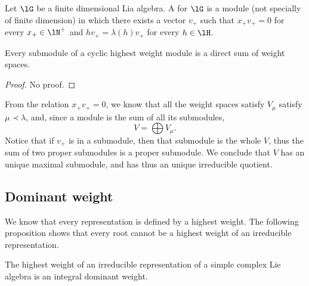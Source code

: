 \begin{definition}
	Let $\lG$ be a finite dimensional Lia algebra. A  for $\lG$ is a module (not specially of finite dimension) in which there exists a vector $v_+$ such that $x_+v_+=0$ for every $x_+\in\lN^+$ and $hv_+=\lambda(h)v_+$ for every $h\in\lH$.
\end{definition}

\begin{proposition}
	Every submodule of a cyclic highest weight module is a direct sum of weight spaces.
\end{proposition}
\begin{proof}
	No proof.
\end{proof}

From the relation $x_+v_+=0$, we know that all the weight spaces satisfy $V_{\mu}$ satisfy $\mu\prec\lambda$, and, since a module is the sum of all its submodules,
\begin{equation}        \label{EqVsumValpha}
	V=\bigoplus V_{\mu}.
\end{equation}
Notice that if $v_+$ is in a submodule, then that submodule is the whole $V$, thus the sum of two proper submodules is a proper submodule. We conclude that $V$ has an unique maximal submodule, and has thus an unique irreducible quotient.

\subsection{Dominant weight}
\label{SubSecDomiunSei}

We know that every representation is defined by a highest weight. The following proposition shows that every root cannot be a highest weight of an irreducible representation.

\begin{proposition}
	The highest weight of an irreducible representation of a simple complex Lie algebra is an integral dominant weight.
\end{proposition}

